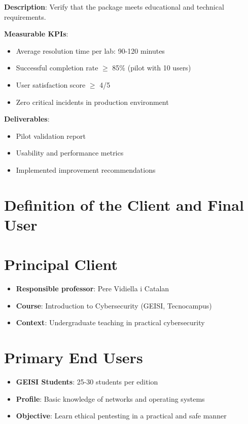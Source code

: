 \textbf{Description}: Verify that the package meets educational and technical requirements.

\textbf{Measurable KPIs}:
\begin{itemize}
\item Average resolution time per lab: 90-120 minutes
\item Successful completion rate $\geq$ 85\% (pilot with 10 users)
\item User satisfaction score $\geq$ 4/5
\item Zero critical incidents in production environment
\end{itemize}

\textbf{Deliverables}:
\begin{itemize}
\item Pilot validation report
\item Usability and performance metrics
\item Implemented improvement recommendations
\end{itemize}

\section{Definition of the Client and Final User}

\section{Principal Client}
\begin{itemize}
\item \textbf{Responsible professor}: Pere Vidiella i Catalan
\item \textbf{Course}: Introduction to Cybersecurity (GEISI, Tecnocampus)
\item \textbf{Context}: Undergraduate teaching in practical cybersecurity
\end{itemize}

\section{Primary End Users}

\begin{itemize}
\item \textbf{GEISI Students}: 25-30 students per edition
\item \textbf{Profile}: Basic knowledge of networks and operating systems
\item \textbf{Objective}: Learn ethical pentesting in a practical and safe manner
\end{itemize}

